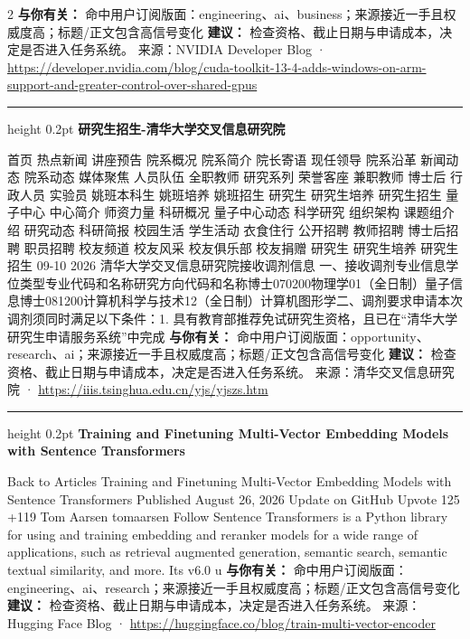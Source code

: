 \documentclass[10.5pt]{ctexart}
\begin{document}
\begin{multicols}{2}
\textbf{与你有关：} 命中用户订阅版面：engineering、ai、business；来源接近一手且权威度高；标题/正文包含高信号变化
\textbf{建议：} 检查资格、截止日期与申请成本，决定是否进入任务系统。
{\footnotesize\color{ormuted} 来源：NVIDIA Developer Blog · \url{https://developer.nvidia.com/blog/cuda-toolkit-13-4-adds-windows-on-arm-support-and-greater-control-over-shared-gpus}}
\vspace{2mm}
\hrule height 0.2pt
\vspace{2mm}
{\large\bfseries 研究生招生-清华大学交叉信息研究院}\par
首页 热点新闻 讲座预告 院系概况 院系简介 院长寄语 现任领导 院系沿革 新闻动态 院系动态 媒体聚焦 人员队伍 全职教师 研究系列 荣誉客座 兼职教师 博士后 行政人员 实验员 姚班本科生 姚班培养 姚班招生 研究生 研究生培养 研究生招生 量子中心 中心简介 师资力量 科研概况 量子中心动态 科学研究 组织架构 课题组介绍 研究动态 科研简报 校园生活 学生活动 衣食住行 公开招聘 教师招聘 博士后招聘 职员招聘 校友频道 校友风采 校友俱乐部 校友捐赠 研究生 研究生培养 研究生招生 09-10 2026 清华大学交叉信息研究院接收调剂信息 一、接收调剂专业信息学位类型专业代码和名称研究方向代码和名称博士070200物理学01（全日制）量子信息博士081200计算机科学与技术12（全日制）计算机图形学二、调剂要求申请本次调剂须同时满足以下条件：1. 具有教育部推荐免试研究生资格，且已在“清华大学研究生申请服务系统”中完成
\textbf{与你有关：} 命中用户订阅版面：opportunity、research、ai；来源接近一手且权威度高；标题/正文包含高信号变化
\textbf{建议：} 检查资格、截止日期与申请成本，决定是否进入任务系统。
{\footnotesize\color{ormuted} 来源：清华交叉信息研究院 · \url{https://iiis.tsinghua.edu.cn/yjs/yjszs.htm}}
\vspace{2mm}
\hrule height 0.2pt
\vspace{2mm}
{\large\bfseries Training and Finetuning Multi-Vector Embedding Models with Sentence Transformers}\par
Back to Articles Training and Finetuning Multi-Vector Embedding Models with Sentence Transformers Published August 26, 2026 Update on GitHub Upvote 125 +119 Tom Aarsen tomaarsen Follow Sentence Transformers is a Python library for using and training embedding and reranker models for a wide range of applications, such as retrieval augmented generation, semantic search, semantic textual similarity, and more. Its v6.0 u
\textbf{与你有关：} 命中用户订阅版面：engineering、ai、research；来源接近一手且权威度高；标题/正文包含高信号变化
\textbf{建议：} 检查资格、截止日期与申请成本，决定是否进入任务系统。
{\footnotesize\color{ormuted} 来源：Hugging Face Blog · \url{https://huggingface.co/blog/train-multi-vector-encoder}}

\end{multicols}
\end{document}
